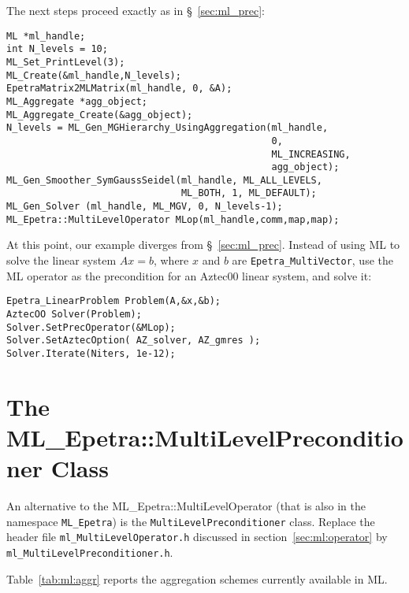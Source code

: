 The next steps proceed exactly as in \S~\ref{sec:ml_prec}:
\begin{verbatim}
ML *ml_handle;
int N_levels = 10;
ML_Set_PrintLevel(3);
ML_Create(&ml_handle,N_levels);
EpetraMatrix2MLMatrix(ml_handle, 0, &A);
ML_Aggregate *agg_object;
ML_Aggregate_Create(&agg_object);
N_levels = ML_Gen_MGHierarchy_UsingAggregation(ml_handle, 
                                               0,
                                               ML_INCREASING,
                                               agg_object);
ML_Gen_Smoother_SymGaussSeidel(ml_handle, ML_ALL_LEVELS,
                               ML_BOTH, 1, ML_DEFAULT);
ML_Gen_Solver (ml_handle, ML_MGV, 0, N_levels-1);
ML_Epetra::MultiLevelOperator MLop(ml_handle,comm,map,map);
\end{verbatim}

At this point, our example diverges from \S~\ref{sec:ml_prec}.
Instead of using ML to solve the linear system $A x = b$,
where $x$ and $b$ are \verb!Epetra_MultiVector!,  use 
the ML operator as the precondition for an Aztec00 linear system,
and solve it:
\begin{verbatim}
Epetra_LinearProblem Problem(A,&x,&b);
AztecOO Solver(Problem);
Solver.SetPrecOperator(&MLop);
Solver.SetAztecOption( AZ_solver, AZ_gmres );
Solver.Iterate(Niters, 1e-12);
\end{verbatim}
\section{The ML\_Epetra::MultiLevelPreconditioner Class}
\label{sec:ml:preconditioner}
An alternative to the ML\_Epetra::MultiLevelOperator
(that is also in the namespace {\tt ML\_Epetra}) 
is the \verb!MultiLevelPreconditioner! class.  Replace the header file 
\newline \verb!ml_MultiLevelOperator.h!  discussed in section~\ref{sec:ml:operator} 
by \verb!ml_MultiLevelPreconditioner.h!.

Table~\ref{tab:ml:aggr} reports the aggregation schemes currently
available in ML. 


